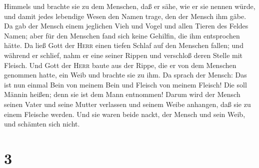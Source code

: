 Himmels und brachte sie zu dem Menschen, daß er sähe, wie er sie nennen
würde, und damit jedes lebendige Wesen den Namen trage, den der Mensch
ihm gäbe.  Da gab der Mensch einem jeglichen Vieh und
Vogel und allen Tieren des Feldes Namen; aber für den Menschen fand sich
keine Gehilfin, die ihm entsprochen hätte.  Da ließ Gott
der \textsc{Herr} einen tiefen Schlaf auf den Menschen fallen; und
während er schlief, nahm er eine seiner Rippen und verschloß deren
Stelle mit Fleisch.  Und Gott der \textsc{Herr} baute aus
der Rippe, die er von dem Menschen genommen hatte, ein Weib und brachte
sie zu ihm.  Da sprach der Mensch: Das ist nun einmal
Bein von meinem Bein und Fleisch von meinem Fleisch! Die soll Männin
heißen; denn sie ist dem Mann entnommen!  Darum wird der
Mensch seinen Vater und seine Mutter verlassen und seinem Weibe
anhangen, daß sie zu einem Fleische werden.  Und sie
waren beide nackt, der Mensch und sein Weib, und schämten sich nicht.

\hypertarget{section-2}{%
\section{3}\label{section-2}}

